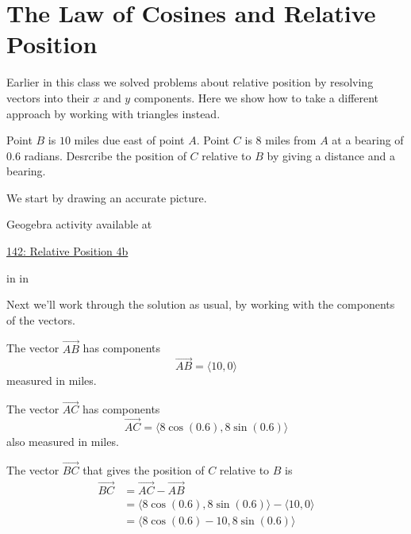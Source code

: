 \documentclass{ximera}
\newcommand{\pskip}{\vskip 0.1 in}
\begin{document}
\section{The Law of Cosines and Relative Position}
Earlier in this class we solved problems about relative position by resolving vectors into their $x$ and $y$ components. Here we show how to take a different approach by working with triangles instead.

 \begin{example}  \label{Exergt43tgr}
Point $B$ is $10$ miles due east of point $A$. Point $C$ is $8$ miles from $A$ at a bearing of $0.6$ radians. Desrcribe the position of $C$ relative to $B$ by giving a distance and a bearing.

\begin{explanation}
We start by drawing an accurate picture.

 
\begin{onlineOnly}
    \begin{center}
\end{center}
\end{onlineOnly}


Geogebra activity available at

\href{https://www.geogebra.org/classic/vsdrcnqm}{142: Relative Position 4b}


\pskip \pskip

Next we'll work through the solution as usual, by working with the components of the vectors.

The vector $\overrightarrow{AB}$ has components
\[
   \overrightarrow{AB} = \langle 10, 0  \rangle
\]
measured in miles.

The vector $\overrightarrow{AC}$ has components
\[
    \overrightarrow{AC} = \langle 8 \cos (0.6), 8 \sin(0.6)  \rangle
\]
also measured in miles.

The vector $\overrightarrow{BC}$ that gives the position of $C$ relative to $B$ is
\begin{align*}
       \overrightarrow{BC} &= \overrightarrow{AC} - \overrightarrow{AB}    \\
                                    &= \langle 8 \cos (0.6), 8 \sin(0.6)  \rangle - \langle 10, 0  \rangle \\
                                    &= \langle 8 \cos (0.6) - 10, 8 \sin(0.6)  \rangle
\end{align*}


\end{explanation}
\end{example}
\end{document}
